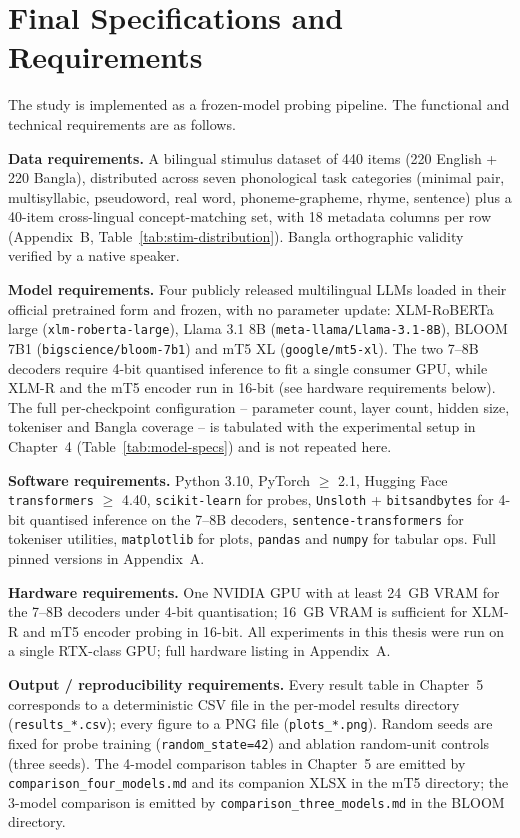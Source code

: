 \section{Final Specifications and Requirements}

The study is implemented as a frozen-model probing pipeline. The functional and technical requirements are as follows.

\textbf{Data requirements.} A bilingual stimulus dataset of 440 items (220 English + 220 Bangla), distributed across seven phonological task categories (minimal pair, multisyllabic, pseudoword, real word, phoneme-grapheme, rhyme, sentence) plus a 40-item cross-lingual concept-matching set, with 18 metadata columns per row (Appendix~B, Table~\ref{tab:stim-distribution}). Bangla orthographic validity verified by a native speaker.

\textbf{Model requirements.} Four publicly released multilingual LLMs loaded in their official pretrained form and frozen, with no parameter update: XLM-RoBERTa large (\texttt{xlm-roberta-large}), Llama 3.1 8B (\texttt{meta-llama/Llama-3.1-8B}), BLOOM 7B1 (\texttt{bigscience/bloom-7b1}) and mT5 XL (\texttt{google/mt5-xl}). The two 7--8B decoders require 4-bit quantised inference to fit a single consumer GPU, while XLM-R and the mT5 encoder run in 16-bit (see hardware requirements below). The full per-checkpoint configuration -- parameter count, layer count, hidden size, tokeniser and Bangla coverage -- is tabulated with the experimental setup in Chapter~4 (Table~\ref{tab:model-specs}) and is not repeated here.

\textbf{Software requirements.} Python 3.10, PyTorch $\geq$ 2.1, Hugging Face \texttt{transformers} $\geq$ 4.40, \texttt{scikit-learn} for probes, \texttt{Unsloth} + \texttt{bitsandbytes} for 4-bit quantised inference on the 7--8B decoders, \texttt{sentence-transformers} for tokeniser utilities, \texttt{matplotlib} for plots, \texttt{pandas} and \texttt{numpy} for tabular ops. Full pinned versions in Appendix~A.

\textbf{Hardware requirements.} One NVIDIA GPU with at least 24~GB VRAM for the 7--8B decoders under 4-bit quantisation; 16~GB VRAM is sufficient for XLM-R and mT5 encoder probing in 16-bit. All experiments in this thesis were run on a single RTX-class GPU; full hardware listing in Appendix~A.

\textbf{Output / reproducibility requirements.} Every result table in Chapter~5 corresponds to a deterministic CSV file in the per-model results directory (\texttt{results\_*.csv}); every figure to a PNG file (\texttt{plots\_*.png}). Random seeds are fixed for probe training (\texttt{random\_state=42}) and ablation random-unit controls (three seeds). The 4-model comparison tables in Chapter~5 are emitted by \texttt{comparison\_four\_models.md} and its companion XLSX in the mT5 directory; the 3-model comparison is emitted by \texttt{comparison\_three\_models.md} in the BLOOM directory.


